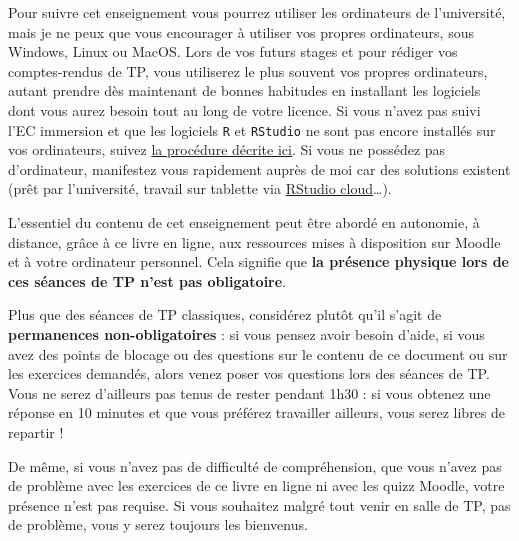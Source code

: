 \documentclass[
  a4paper,
  DIV=11,
  numbers=noendperiod,
  oneside]{scrreprt}
\begin{document}
Pour suivre cet enseignement vous pourrez utiliser les ordinateurs de
l'université, mais je ne peux que vous encourager à utiliser vos propres
ordinateurs, sous Windows, Linux ou MacOS. Lors de vos futurs stages et
pour rédiger vos comptes-rendus de TP, vous utiliserez le plus souvent
vos propres ordinateurs, autant prendre dès maintenant de bonnes
habitudes en installant les logiciels dont vous aurez besoin tout au
long de votre licence. Si vous n'avez pas suivi l'EC immersion et que
les logiciels \texttt{R} et \texttt{RStudio} ne sont pas encore
installés sur vos ordinateurs, suivez
\href{https://besibo.github.io/BiometrieS3/01-R-basics.html\#sec-install}{la
procédure décrite ici}. Si vous ne possédez pas d'ordinateur, manifestez
vous rapidement auprès de moi car des solutions existent (prêt par
l'université, travail sur tablette via
\href{https://rstudio.cloud}{RStudio cloud}\ldots).

\begin{tcolorbox}[enhanced jigsaw, toprule=.15mm, coltitle=black, colframe=quarto-callout-important-color-frame, titlerule=0mm, leftrule=.75mm, opacityback=0, bottomrule=.15mm, title=\textcolor{quarto-callout-important-color}{\faExclamation}\hspace{0.5em}{Important}, colbacktitle=quarto-callout-important-color!10!white, breakable, colback=white, left=2mm, toptitle=1mm, arc=.35mm, bottomtitle=1mm, rightrule=.15mm, opacitybacktitle=0.6]
L'essentiel du contenu de cet enseignement peut être abordé en
autonomie, à distance, grâce à ce livre en ligne, aux ressources mises à
disposition sur Moodle et à votre ordinateur personnel. Cela signifie
que \textbf{la présence physique lors de ces séances de TP n'est pas
obligatoire}.
\end{tcolorbox}

Plus que des séances de TP classiques, considérez plutôt qu'il s'agit de
\textbf{permanences non-obligatoires} : si vous pensez avoir besoin
d'aide, si vous avez des points de blocage ou des questions sur le
contenu de ce document ou sur les exercices demandés, alors venez poser
vos questions lors des séances de TP. Vous ne serez d'ailleurs pas tenus
de rester pendant 1h30 : si vous obtenez une réponse en 10 minutes et
que vous préférez travailler ailleurs, vous serez libres de repartir !

De même, si vous n'avez pas de difficulté de compréhension, que vous
n'avez pas de problème avec les exercices de ce livre en ligne ni avec
les quizz Moodle, votre présence n'est pas requise. Si vous souhaitez
malgré tout venir en salle de TP, pas de problème, vous y serez toujours
les bienvenus.
\end{document}
